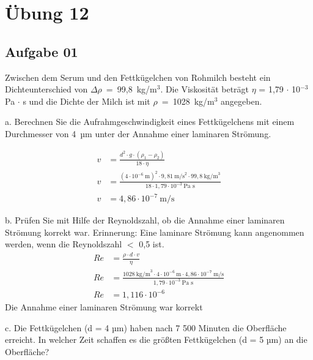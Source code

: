 \documentclass[a4paper,10pt]{article}
\begin{document}
\sidebar
{}
\par \vspace*{5mm}


\section*{Übung 12}

\subsection*{Aufgabe 01}
Zwischen dem Serum und den Fettkügelchen von Rohmilch besteht ein Dichteunterschied
von \mbox{$\Delta \rho$ = 99,8 kg/m$^3$.} Die Viskosität beträgt $\eta$ = 1,79 $\cdot$ 10$^{-3}$ Pa $\cdot$ s und die Dichte der Milch ist
mit \mbox{$\rho$ = 1028 kg/m$^3$} angegeben. 

\pp
a. Berechnen Sie die Aufrahmgeschwindigkeit eines Fettkügelchens mit einem
Durchmesser von \mbox{4 µm} unter der Annahme einer laminaren Strömung.

\begin{align*}
v &= \frac{d^2 \cdot g \cdot (\rho_1 - \rho_2)}{18 \cdot \eta} \\
v &= \frac{(4 \cdot 10^{-6} ~\text{m})^2 \cdot 9,81 ~\text{m/s}^2 \cdot 99,8 ~\text{kg/m}^3}{18 \cdot 1,79 \cdot 10^{-3} ~\text{Pa s}} \\
v &= 4,86 \cdot 10^{-7} ~\text{m/s}
\end{align*}


\pp
b. Prüfen Sie mit Hilfe der Reynoldszahl, ob die Annahme einer laminaren Strömung
korrekt war. Erinnerung: Eine laminare Strömung kann angenommen werden, wenn
die Reynoldszahl $<$ 0,5 ist.
\begin{align*}
Re &= \frac{\rho \cdot d \cdot v}{\eta} \\
Re &= \frac{1028 ~\text{kg/m}^3 \cdot 4 \cdot 10^{-6} ~\text{m} \cdot 4,86 \cdot 10^{-7} ~\text{m/s}}{1,79 \cdot 10^{-3} ~\text{Pa s}} \\
Re &= 1,116 \cdot 10^{-6}
\end{align*}
\RA Die Annahme einer laminaren Strömung war korrekt

\pp
c. Die Fettkügelchen (d = 4 µm) haben nach 7 500 Minuten die Oberfläche erreicht. In
welcher Zeit schaffen es die größten Fettkügelchen (d = 5 µm) an die Oberfläche?
\end{document}
